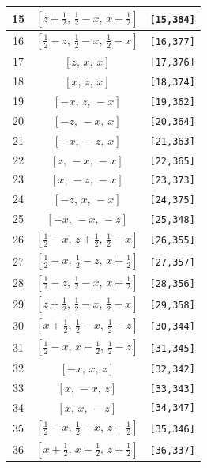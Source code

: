 \documentclass[fleqn,8pt]{jsarticle}
\begin{document}
\begin{longtable}{ccc}
15 & $\left[ z + \frac{1}{2},\, \frac{1}{2} - x,\, x + \frac{1}{2} \right]$ & {\tt [15,384]} \\ \hline
16 & $\left[ \frac{1}{2} - z,\, \frac{1}{2} - x,\, \frac{1}{2} - x \right]$ & {\tt [16,377]} \\ \hline
17 & $\left[ z,\, x,\, x \right]$ & {\tt [17,376]} \\ \hline
18 & $\left[ x,\, z,\, x \right]$ & {\tt [18,374]} \\ \hline
19 & $\left[ - x,\, z,\, - x \right]$ & {\tt [19,362]} \\ \hline
20 & $\left[ - z,\, - x,\, x \right]$ & {\tt [20,364]} \\ \hline
21 & $\left[ - x,\, - z,\, x \right]$ & {\tt [21,363]} \\ \hline
22 & $\left[ z,\, - x,\, - x \right]$ & {\tt [22,365]} \\ \hline
23 & $\left[ x,\, - z,\, - x \right]$ & {\tt [23,373]} \\ \hline
24 & $\left[ - z,\, x,\, - x \right]$ & {\tt [24,375]} \\ \hline
25 & $\left[ - x,\, - x,\, - z \right]$ & {\tt [25,348]} \\ \hline
26 & $\left[ \frac{1}{2} - x,\, z + \frac{1}{2},\, \frac{1}{2} - x \right]$ & {\tt [26,355]} \\ \hline
27 & $\left[ \frac{1}{2} - x,\, \frac{1}{2} - z,\, x + \frac{1}{2} \right]$ & {\tt [27,357]} \\ \hline
28 & $\left[ \frac{1}{2} - z,\, \frac{1}{2} - x,\, x + \frac{1}{2} \right]$ & {\tt [28,356]} \\ \hline
29 & $\left[ z + \frac{1}{2},\, \frac{1}{2} - x,\, \frac{1}{2} - x \right]$ & {\tt [29,358]} \\ \hline
30 & $\left[ x + \frac{1}{2},\, \frac{1}{2} - x,\, \frac{1}{2} - z \right]$ & {\tt [30,344]} \\ \hline
31 & $\left[ \frac{1}{2} - x,\, x + \frac{1}{2},\, \frac{1}{2} - z \right]$ & {\tt [31,345]} \\ \hline
32 & $\left[ - x,\, x,\, z \right]$ & {\tt [32,342]} \\ \hline
33 & $\left[ x,\, - x,\, z \right]$ & {\tt [33,343]} \\ \hline
34 & $\left[ x,\, x,\, - z \right]$ & {\tt [34,347]} \\ \hline
35 & $\left[ \frac{1}{2} - x,\, \frac{1}{2} - x,\, z + \frac{1}{2} \right]$ & {\tt [35,346]} \\ \hline
36 & $\left[ x + \frac{1}{2},\, x + \frac{1}{2},\, z + \frac{1}{2} \right]$ & {\tt [36,337]} \\ \hline

\end{longtable}
\end{document}
